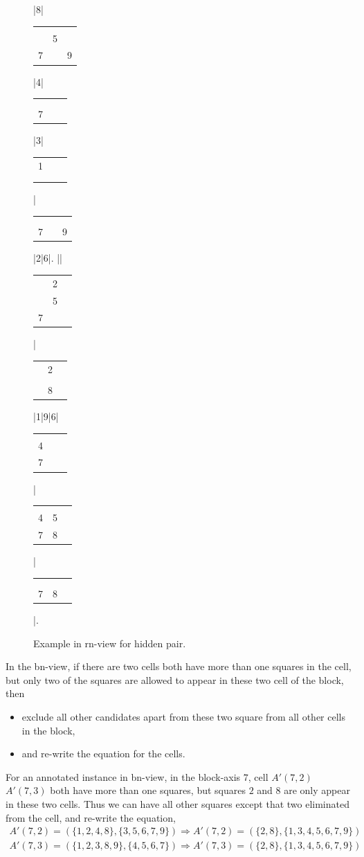 \documentclass[11pt]{report}
\newcommand{\cell}[9]{%
\scriptsize
\setlength{\tabcolsep}{1pt}
\renewcommand{\arraystretch}{0.5}
\hspace{-0.6em}
\begin{tabular}{ccc}
#1 & #2 & #3\\
#4 & #5 & #6\\
#7 & #8 & #9
\end{tabular}
}
\newcommand{\set}[1]{\{ #1 \}}
\begin{document}
\begin{figure}[htbp]
\begin{sudoku}
|{8}|{\cell {}{}{}{}5{}7{}9}|4| {\cell {}{}{}{}{}{}7{}{}}|3| {\cell 1{}{}{}{}{}{}{}{}}|{\cell {}{}{}{}{}{}7{}9}|2|6|.
|{\makebox[0pt]{\hspace{-2.3em}\large r9}{\cell {}{}3{}{}{}{}{}{}}}| {\cell {}2{}{}5{}7{}{}}|{\cell {}2{}{}{}{}{}8{}}|1|9|6|{\cell {}{}{}4{}{}7{}{}}| {\cell {}{}{}45{}78{}}|{\cell {}{}{}{}{}{}78{}}|.
\end{sudoku}
\caption{Example in rn-view for hidden pair.}
\label{fig:hiddenpairrn}
\end{figure}

In the bn-view, if there are two cells both have more than one squares in the cell, but only two of the squares are allowed to appear in these two cell of the block, then
\begin{itemize}
\item exclude all other candidates apart from these two square from all other cells in the block,
\item and re-write the equation for the cells.
\end{itemize}
For an annotated instance in bn-view, in the block-axis $7$, cell $A'(7,2)$ $A'(7,3)$ both have more than one squares, but squares $2$ and $8$ are only appear in these two cells. Thus we can have all other squares except that two eliminated from the cell, and re-write the equation,
\begin{eqnarray*}
A'(7,2) = (\set{1, 2, 4, 8}, \set{3, 5, 6, 7, 9}) \Rightarrow A'(7,2) = (\set{2, 8}, \set{1, 3, 4, 5, 6, 7, 9})\\
A'(7,3) = (\set{1, 2, 3, 8, 9}, \set{4, 5, 6, 7}) \Rightarrow A'(7,3) = (\set{2, 8}, \set{1, 3, 4, 5, 6, 7, 9})\\
\end{eqnarray*}
\end{document}
